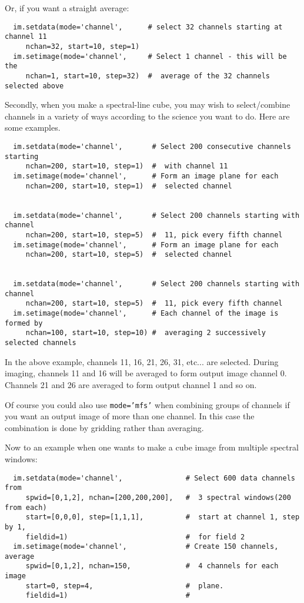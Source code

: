 Or, if you want a straight average:

\small
\begin{verbatim}
  im.setdata(mode='channel',      # select 32 channels starting at channel 11
     nchan=32, start=10, step=1)
  im.setimage(mode='channel',     # Select 1 channel - this will be the
     nchan=1, start=10, step=32)  #  average of the 32 channels selected above
\end{verbatim}
\normalsize

Secondly, when you make a spectral-line cube, you may wish to
select/combine channels in a variety of ways according to the science
you want to do.  Here are some examples.

\small
\begin{verbatim}
  im.setdata(mode='channel',       # Select 200 consecutive channels starting
     nchan=200, start=10, step=1)  #  with channel 11
  im.setimage(mode='channel',      # Form an image plane for each
     nchan=200, start=10, step=1)  #  selected channel


  im.setdata(mode='channel',       # Select 200 channels starting with channel
     nchan=200, start=10, step=5)  #  11, pick every fifth channel
  im.setimage(mode='channel',      # Form an image plane for each
     nchan=200, start=10, step=5)  #  selected channel


  im.setdata(mode='channel',       # Select 200 channels starting with channel
     nchan=200, start=10, step=5)  #  11, pick every fifth channel
  im.setimage(mode='channel',      # Each channel of the image is formed by
     nchan=100, start=10, step=10) #  averaging 2 successively selected channels
\end{verbatim}
\normalsize


In the above example, channels 11, 16, 21, 26, 31, etc...  are
selected.  During imaging, channels 11 and 16 will be averaged to form
output image channel 0.  Channels 21 and 26 are averaged to form
output channel 1 and so on.

Of course you could also use {\tt mode='mfs'} when combining groups of
channels if you want an output image of more than one channel.  In
this case the combination is done by gridding rather than averaging.

Now to an example when one wants to make a cube image from multiple spectral
windows:

\small
\begin{verbatim}
  im.setdata(mode='channel',               # Select 600 data channels from
     spwid=[0,1,2], nchan=[200,200,200],   #  3 spectral windows(200 from each)
     start=[0,0,0], step=[1,1,1],          #  start at channel 1, step by 1,
     fieldid=1)                            #  for field 2
  im.setimage(mode='channel',              # Create 150 channels, average
     spwid=[0,1,2], nchan=150,             #  4 channels for each image
     start=0, step=4,                      #  plane.
     fieldid=1)                            #
\end{verbatim}
\normalsize


